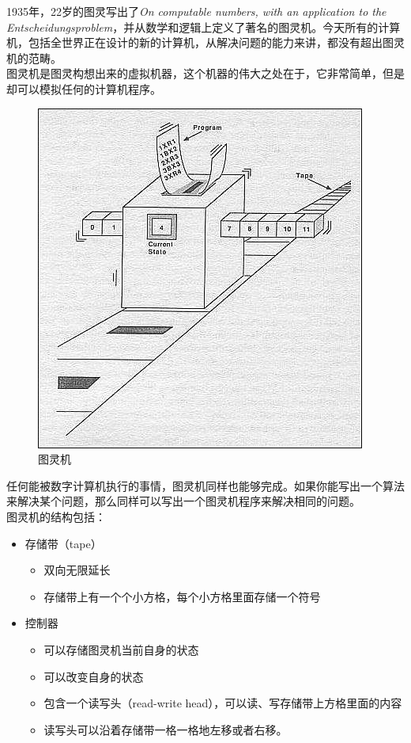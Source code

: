 1935年，22岁的图灵写出了\textit{On computable numbers, with an application to the Entscheidungsproblem}，并从数学和逻辑上定义了著名的图灵机。今天所有的计算机，包括全世界正在设计的新的计算机，从解决问题的能力来讲，都没有超出图灵机的范畴。\\

图灵机是图灵构想出来的虚拟机器，这个机器的伟大之处在于，它非常简单，但是却可以模拟任何的计算机程序。\\

\begin{figure}[H]
    \centering
    \includegraphics[scale=3]{img/C3/3-1/1.png}
    \caption{图灵机}
\end{figure}

任何能被数字计算机执行的事情，图灵机同样也能够完成。如果你能写出一个算法来解决某个问题，那么同样可以写出一个图灵机程序来解决相同的问题。\\

图灵机的结构包括：

\begin{itemize}
    \item 存储带（tape）
          \begin{itemize}
              \item 双向无限延长
              \item 存储带上有一个个小方格，每个小方格里面存储一个符号
          \end{itemize}

    \item 控制器
          \begin{itemize}
              \item 可以存储图灵机当前自身的状态
              \item 可以改变自身的状态
              \item 包含一个读写头（read-write head），可以读、写存储带上方格里面的内容
              \item 读写头可以沿着存储带一格一格地左移或者右移。
          \end{itemize}
\end{itemize}

